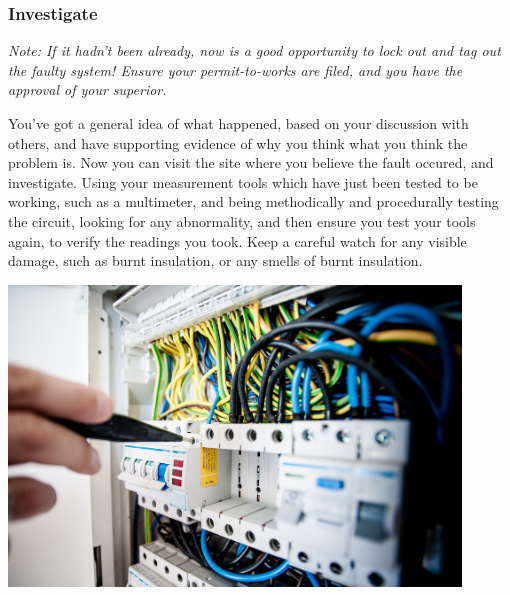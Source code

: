 \documentclass[11pt,a4paper]{article}
\begin{document}
\subsubsection{Investigate}
\textit{Note: If it hadn't been already, now is a good opportunity to lock out and tag out the faulty system! Ensure your permit-to-works are filed, and you have the approval of your superior.}\par
You've got a general idea of what happened, based on your discussion with others, and have supporting evidence of why you think what you think the problem is. Now you can visit the site where you believe the fault occured, and investigate. Using your measurement tools which have just been tested to be working, such as a multimeter, and being methodically and procedurally testing the circuit, looking for any abnormality, and then ensure you test your tools again, to verify the readings you took. Keep a careful watch for any visible damage, such as burnt insulation, or any smells of burnt insulation.
\begin{center}
  \includegraphics[width=12cm]{multimeter}
\end{center}
\end{document}
